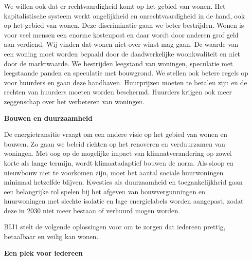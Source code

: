 We willen ook dat er rechtvaardigheid komt op het gebied van wonen. Het
kapitalistische systeem werkt ongelijkheid en onrechtvaardigheid in de
hand, ook op het gebied van wonen. Deze discriminatie gaan we beter
bestrijden. Wonen is voor veel mensen een enorme kostenpost en daar
wordt door anderen grof geld aan verdiend. Wij vinden dat wonen niet
over winst mag gaan. De waarde van een woning moet worden bepaald door
de daadwerkelijke woonkwaliteit en niet door de marktwaarde. We
bestrijden leegstand van woningen, speculatie met leegstaande panden en
speculatie met bouwgrond. We stellen ook betere regels op voor huurders
en gaan deze handhaven. Huurprijzen moeten te betalen zijn en de rechten
van huurders moeten worden beschermd. Huurders krijgen ook meer
zeggenschap over het verbeteren van woningen.

\textbf{Bouwen en duurzaamheid}

De energietransitie vraagt om een andere visie op het gebied van wonen
en bouwen. Zo gaan we beleid richten op het renoveren en verduurzamen
van woningen. Met oog op de mogelijke impact van klimaatverandering op
zowel korte als lange termijn, wordt klimaatadaptief bouwen de norm. Als
sloop en nieuwbouw niet te voorkomen zijn, moet het aantal sociale
huurwoningen minimaal hetzelfde blijven. Kwesties als duurzaamheid en
toegankelijkheid gaan een belangrijke rol spelen bij het afgeven van
bouwvergunningen en huurwoningen met slechte isolatie en lage
energielabels worden aangepast, zodat deze in 2030 niet meer bestaan of
verhuurd mogen worden.

BIJ1 stelt de volgende oplossingen voor om te zorgen dat iedereen
prettig, betaalbaar en veilig kan wonen.

\textbf{Een plek voor iedereen}


